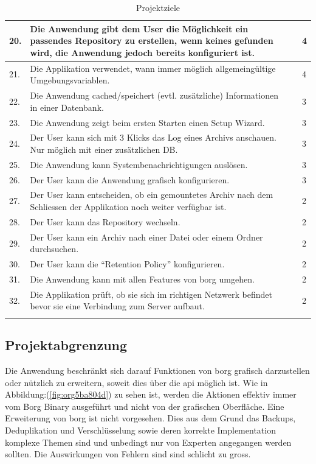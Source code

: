 \begin{longtable}{|p{1cm}|p{9cm}|p{1.5cm}|p{2cm}|}
\hline
20. & Die Anwendung gibt dem User die Möglichkeit ein passendes Repository zu erstellen, wenn keines gefunden wird, die Anwendung jedoch bereits konfiguriert ist. &  & 4\\
\hline
21. & Die Applikation verwendet, wann immer möglich allgemeingültige Umgebungsvariablen. &  & 4\\
\hline
22. & Die Anwendung cached/speichert (evtl. zusätzliche) Informationen in einer Datenbank. &  & 3\\
\hline
23. & Die Anwendung zeigt beim ersten Starten einen Setup Wizard. &  & 3\\
\hline
24. & Der User kann sich mit 3 Klicks das Log eines Archivs anschauen. Nur möglich mit einer zusätzlichen DB. &  & 3\\
\hline
25. & Die Anwendung kann Systembenachrichtigungen auslösen. &  & 3\\
\hline
26. & Der User kann die Anwendung grafisch konfigurieren. &  & 3\\
\hline
27. & Der User kann entscheiden, ob ein gemountetes Archiv nach dem Schliessen der Applikation noch weiter verfügbar ist. &  & 2\\
\hline
28. & Der User kann das Repository wechseln. &  & 2\\
\hline
29. & Der User kann ein Archiv nach einer Datei oder einem Ordner durchsuchen. &  & 2\\
\hline
30. & Der User kann die "`Retention Policy"' konfigurieren. &  & 2\\
\hline
31. & Die Anwendung kann mit allen Features von \gls{borg} umgehen. &  & 2\\
\hline
32. & Die Applikation prüft, ob sie sich im richtigen Netzwerk befindet bevor sie eine Verbindung zum Server aufbaut. &  & 2\\
\hline
\caption{\label{tab:org2ab4045}
Projektziele}
\\
\end{longtable}
\newpage

\subsection{Projektabgrenzung}
\label{sec:org82d5209}

Die Anwendung beschränkt sich darauf Funktionen von \gls{borg} grafisch
darzustellen oder nützlich zu erweitern, soweit dies über die \gls{api} möglich
ist. Wie in Abbildung:(\ref{fig:org5ba804d}) zu sehen ist, werden die Aktionen effektiv
immer vom Borg Binary ausgeführt und nicht von der grafischen Oberfläche. Eine
Erweiterung von \gls{borg} ist nicht vorgesehen. Dies aus dem Grund das Backups,
Deduplikation und Verschlüsselung sowie deren korrekte Implementation komplexe
Themen sind und unbedingt nur von Experten angegangen werden sollten. Die
Auswirkungen von Fehlern sind sind schlicht zu gross.

